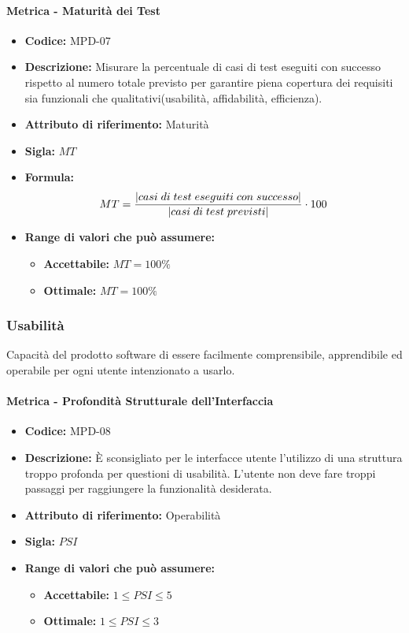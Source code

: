 \paragraph{Metrica - Maturità dei Test} 
\begin{itemize}
    \item \textbf{Codice:} MPD-07
    \item \textbf{Descrizione:} Misurare la percentuale di casi di test eseguiti con successo rispetto al numero totale previsto per garantire piena copertura dei requisiti sia funzionali che qualitativi(usabilità, affidabilità, efficienza).
    \item \textbf{Attributo di riferimento:} Maturità
    \item \textbf{Sigla:} $MT$
    \item \textbf{Formula:} $$MT = {|casi \; di \; test \; eseguiti \; con \; successo| \over |casi \; di \; test \; previsti|} \cdot 100$$
    \item \textbf{Range di valori che può assumere:}
    \begin{itemize}
        \item \textbf{Accettabile:} $MT = 100\% $
        \item \textbf{Ottimale:} $MT = 100\% $
    \end{itemize}
\end{itemize}
       
\subsubsection{Usabilità}
Capacità del prodotto software di essere facilmente comprensibile, apprendibile ed operabile per ogni utente intenzionato a usarlo.

\paragraph{Metrica - Profondità Strutturale dell'Interfaccia}
\begin{itemize}
    \item \textbf{Codice:} MPD-08
    \item \textbf{Descrizione:} È sconsigliato per le interfacce utente l'utilizzo di una struttura troppo profonda per questioni di usabilità. L'utente non deve fare troppi passaggi per raggiungere la funzionalità desiderata. 
    \item \textbf{Attributo di riferimento:} Operabilità
    \item \textbf{Sigla:} $PSI$
    \item \textbf{Range di valori che può assumere:}
    \begin{itemize}
        \item \textbf{Accettabile:} $1 \leq PSI \leq 5$
        \item \textbf{Ottimale:} $1 \leq PSI \leq 3$
    \end{itemize}
\end{itemize}

